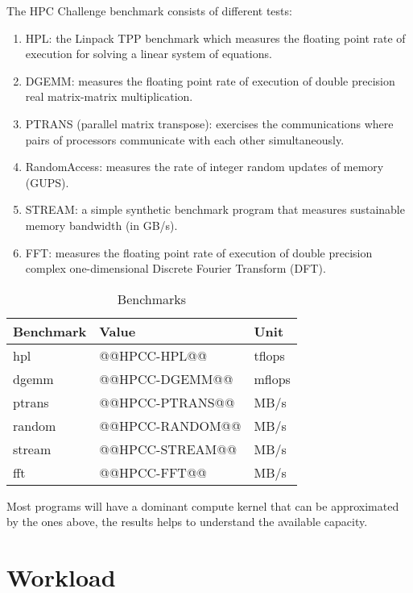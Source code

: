 \documentclass[a4paper]{article}
\begin{document}
\smallskip

The HPC Challenge benchmark \cite{hpcc} consists of different tests:

\begin{enumerate}
\item{HPL}: the Linpack TPP benchmark which measures the floating point rate of execution for solving a linear system of equations.
\item{DGEMM}: measures the floating point rate of execution of double precision real matrix-matrix multiplication.
\item{PTRANS (parallel matrix transpose)}: exercises the communications where pairs of processors communicate with each other simultaneously.
\item{RandomAccess}: measures the rate of integer random updates of memory (GUPS).
\item{STREAM}: a simple synthetic benchmark program that measures sustainable memory bandwidth (in GB/s).
\item{FFT}: measures the floating point rate of execution of double precision complex one-dimensional Discrete Fourier Transform (DFT).
\end{enumerate}

\begin{table}[H]
\caption{Benchmarks}
  \centering
    \begin{tabular}{|l|l|l|}\hline
      {\bf Benchmark} & {\bf Value} & {\bf Unit} \\ \hline
      hpl & @@HPCC-HPL@@ & tflops \\ \hline
      dgemm & @@HPCC-DGEMM@@ & mflops \\ \hline
      ptrans & @@HPCC-PTRANS@@ & MB/s \\ \hline
      random & @@HPCC-RANDOM@@ & MB/s \\ \hline
      stream & @@HPCC-STREAM@@ & MB/s \\ \hline
      fft & @@HPCC-FFT@@ & MB/s \\ \hline
    \end{tabular}
 \label{table:pruebas}
\end{table}

\smallskip

Most programs will have a dominant compute kernel that can be approximated by the ones above, the results helps to understand the available capacity.

\section{Workload}
\end{document}
